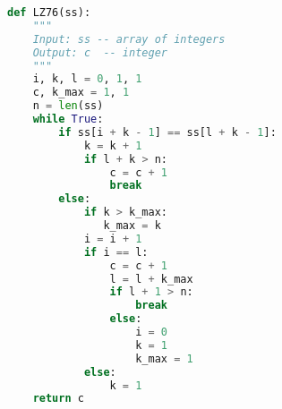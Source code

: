 \begin{lstlisting}[language=python]
def LZ76(ss):
    """    
    Input: ss -- array of integers
    Output: c  -- integer
    """
    i, k, l = 0, 1, 1
    c, k_max = 1, 1
    n = len(ss)
    while True:
        if ss[i + k - 1] == ss[l + k - 1]:
            k = k + 1
            if l + k > n:
                c = c + 1
                break
        else:
            if k > k_max:
               k_max = k
            i = i + 1
            if i == l:
                c = c + 1
                l = l + k_max
                if l + 1 > n:
                    break
                else:
                    i = 0
                    k = 1
                    k_max = 1
            else:
                k = 1
    return c
\end{lstlisting}